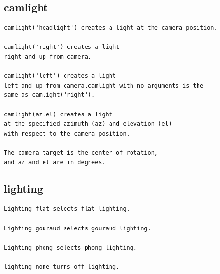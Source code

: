 \documentclass{ximera}
\begin{document}
\subsection{camlight}

\begin{verbatim}
camlight('headlight') creates a light at the camera position.

camlight('right') creates a light
right and up from camera.

camlight('left') creates a light
left and up from camera.camlight with no arguments is the
same as camlight('right').

camlight(az,el) creates a light
at the specified azimuth (az) and elevation (el)
with respect to the camera position.

The camera target is the center of rotation, 
and az and el are in degrees.

\end{verbatim}



\subsection{lighting}


\begin{verbatim}
Lighting flat selects flat lighting.

Lighting gouraud selects gouraud lighting.

Lighting phong selects phong lighting.

lighting none turns off lighting.
\end{verbatim}
\end{document}
